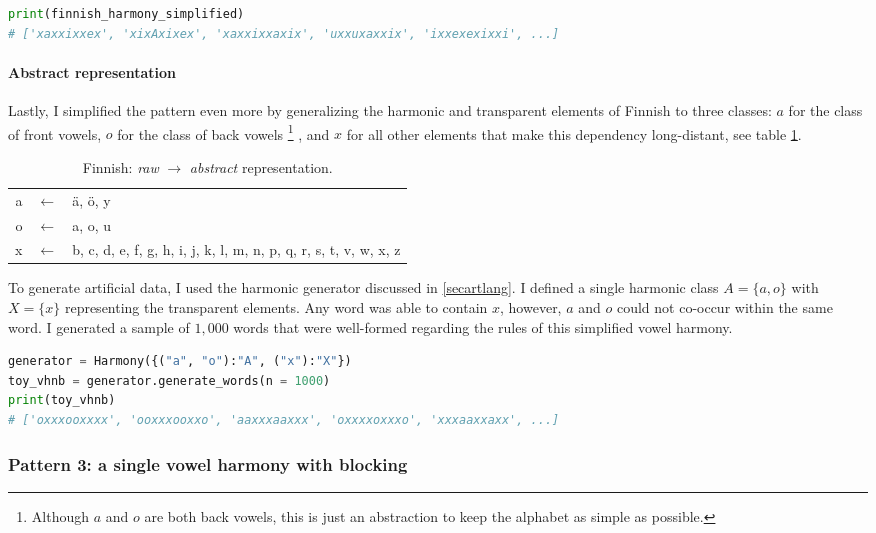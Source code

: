 \begin{lstlisting}[language=Python]
print(finnish_harmony_simplified)
# ['xaxxixxex', 'xixAxixex', 'xaxxixxaxix', 'uxxuxaxxix', 'ixxexexixxi', ...]
\end{lstlisting}

\paragraph{Abstract representation}

Lastly, I simplified the pattern even more by generalizing the harmonic and transparent elements of Finnish to three classes: $a$ for the class of front vowels, $o$ for the class of back vowels
\footnote{Although $a$ and $o$ are both back vowels, this is just an abstraction to keep the alphabet as simple as possible.}
, and $x$ for all other elements that make this dependency long-distant, see table \ref{finnishmap2}.

\begin{table}[h!]
\begin{center}
\begin{tabular}{rcl}
a & $\leftarrow$ & \"a, \"o, y \\
o & $\leftarrow$ & a, o, u \\
x & $\leftarrow$ & b, c, d, e, f, g, h, i, j, k, l, m, n, p, q, r, s, t, v, w, x, z
\end{tabular}
\end{center}
\caption{Finnish: \emph{raw} $\rightarrow$ \emph{abstract} representation.}
\label{finnishmap2}
\end{table}

To generate artificial data, I used the harmonic generator discussed in \ref{secartlang}.
I defined a single harmonic class $A = \{a, o\}$ with $X = \{x\}$ representing the transparent elements.
Any word was able to contain $x$, however, $a$ and $o$ could not co-occur within the same word.
I generated a sample of $1,000$ words that were well-formed regarding the rules of this simplified vowel harmony.

\begin{lstlisting}[language=Python]
generator = Harmony({("a", "o"):"A", ("x"):"X"})
toy_vhnb = generator.generate_words(n = 1000)
print(toy_vhnb)
# ['oxxxooxxxx', 'ooxxxooxxo', 'aaxxxaaxxx', 'oxxxxoxxxo', 'xxxaaxxaxx', ...]
\end{lstlisting}


\subsubsection{Pattern 3: a single vowel harmony with blocking}

